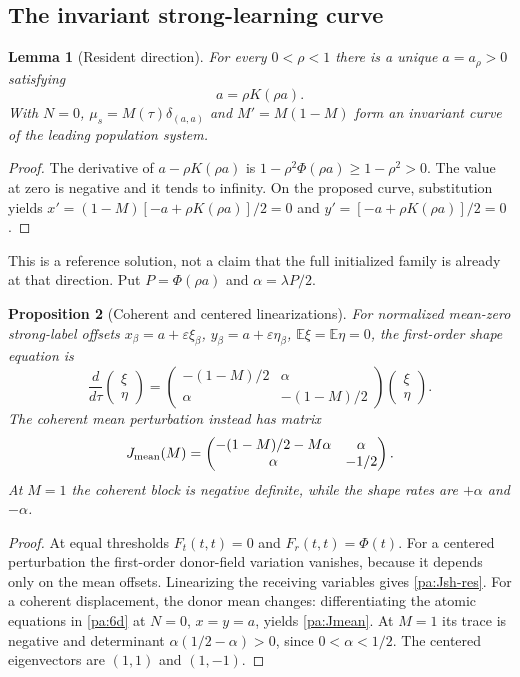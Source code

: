 \documentclass[11pt]{article}
\numberwithin{equation}{section}
\newtheorem{proposition}{Proposition}[section]
\newtheorem{lemma}[proposition]{Lemma}
\theoremstyle{definition}
\theoremstyle{remark}
\newcommand{\E}{\mathbb E}
\newcommand{\1}{\mathbf 1}
\begin{document}
\subsection{The invariant strong-learning curve}
\begin{lemma}[Resident direction]\label{pa:resident}
For every $0<\rho<1$ there is a unique $a=a_\rho>0$ satisfying
\begin{equation}\label{pa:root-a}
 a=\rho K(\rho a).
\end{equation}
With $N=0$, $\mu_s=M(\tau)\delta_{(a,a)}$ and $M'=M(1-M)$ form an
invariant curve of the leading population system.
\end{lemma}
\begin{proof}
The derivative of $a-\rho K(\rho a)$ is
$1-\rho^2\Phi(\rho a)\ge1-\rho^2>0$. The value at zero is negative and
it tends to infinity. On the proposed curve, substitution yields
$x'=(1-M)[-a+\rho K(\rho a)]/2=0$ and
$y'=[-a+\rho K(\rho a)]/2=0$.
\end{proof}
This is a reference solution, not a claim that the full initialized family
is already at that direction.
Put $P=\Phi(\rho a)$ and $\alpha=\lambda P/2$.

\begin{proposition}[Coherent and centered linearizations]\label{pa:spectra}
For normalized mean-zero strong-label offsets
$x_\beta=a+\varepsilon\xi_\beta$, $y_\beta=a+\varepsilon\eta_\beta$,
$\E\xi=\E\eta=0$, the first-order shape equation is
\begin{equation}\label{pa:Jsh-res}
 \frac{d}{d\tau}\begin{pmatrix}\xi\\\eta\end{pmatrix}
 =\begin{pmatrix}-(1-M)/2&\alpha\\\alpha&-(1-M)/2\end{pmatrix}
 \begin{pmatrix}\xi\\\eta\end{pmatrix}.
\end{equation}
The coherent mean perturbation instead has matrix
\begin{equation}\label{pa:Jmean}
 J_{\rm mean}(M)=
 \begin{pmatrix}-(1-M)/2-M\alpha&\alpha\\\alpha&-1/2\end{pmatrix}.
\end{equation}
At $M=1$ the coherent block is negative definite, while the shape rates
are $+\alpha$ and $-\alpha$.
\end{proposition}
\begin{proof}
At equal thresholds $F_t(t,t)=0$ and $F_r(t,t)=\Phi(t)$.
For a centered perturbation the first-order donor-field variation vanishes,
because it depends only on the mean offsets. Linearizing the receiving
variables gives \eqref{pa:Jsh-res}. For a coherent displacement, the donor
mean changes: differentiating the atomic equations in \eqref{pa:6d} at
$N=0$, $x=y=a$, yields \eqref{pa:Jmean}. At $M=1$ its trace is negative
and determinant $\alpha(1/2-\alpha)>0$, since $0<\alpha<1/2$.
The centered eigenvectors are $(1,1)$ and $(1,-1)$.
\end{proof}
\end{document}
